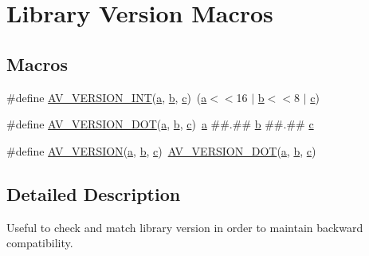 \hypertarget{group__version__utils}{}\section{Library Version Macros}
\label{group__version__utils}
\subsection*{Macros}
\begin{DoxyCompactItemize}
\item 
\#define \hyperlink{group__version__utils_gaaab323b60e1a6e38ec939efe881474c7}{A\+V\+\_\+\+V\+E\+R\+S\+I\+O\+N\+\_\+\+I\+NT}(\hyperlink{rfft2d_test_m_l_8m_a4124bc0a9335c27f086f24ba207a4912}{a},  \hyperlink{convtest_8m_a21ad0bd836b90d08f4cf640b4c298e7c}{b},  \hyperlink{rfft2d_test_m_l_8m_ae0323a9039add2978bf5b49550572c7c}{c})~(\hyperlink{rfft2d_test_m_l_8m_a4124bc0a9335c27f086f24ba207a4912}{a}$<$$<$16 $\vert$ \hyperlink{convtest_8m_a21ad0bd836b90d08f4cf640b4c298e7c}{b}$<$$<$8 $\vert$ \hyperlink{rfft2d_test_m_l_8m_ae0323a9039add2978bf5b49550572c7c}{c})
\item 
\#define \hyperlink{group__version__utils_gae4a414a06fd428d25f6f20007f9c38cd}{A\+V\+\_\+\+V\+E\+R\+S\+I\+O\+N\+\_\+\+D\+OT}(\hyperlink{rfft2d_test_m_l_8m_a4124bc0a9335c27f086f24ba207a4912}{a},  \hyperlink{convtest_8m_a21ad0bd836b90d08f4cf640b4c298e7c}{b},  \hyperlink{rfft2d_test_m_l_8m_ae0323a9039add2978bf5b49550572c7c}{c})~\hyperlink{rfft2d_test_m_l_8m_a4124bc0a9335c27f086f24ba207a4912}{a} \#\#.\#\# \hyperlink{convtest_8m_a21ad0bd836b90d08f4cf640b4c298e7c}{b} \#\#.\#\# \hyperlink{rfft2d_test_m_l_8m_ae0323a9039add2978bf5b49550572c7c}{c}
\item 
\#define \hyperlink{group__version__utils_ga544629c436701faf48e33d650ace1289}{A\+V\+\_\+\+V\+E\+R\+S\+I\+ON}(\hyperlink{rfft2d_test_m_l_8m_a4124bc0a9335c27f086f24ba207a4912}{a},  \hyperlink{convtest_8m_a21ad0bd836b90d08f4cf640b4c298e7c}{b},  \hyperlink{rfft2d_test_m_l_8m_ae0323a9039add2978bf5b49550572c7c}{c})~\hyperlink{group__version__utils_gae4a414a06fd428d25f6f20007f9c38cd}{A\+V\+\_\+\+V\+E\+R\+S\+I\+O\+N\+\_\+\+D\+OT}(\hyperlink{rfft2d_test_m_l_8m_a4124bc0a9335c27f086f24ba207a4912}{a}, \hyperlink{convtest_8m_a21ad0bd836b90d08f4cf640b4c298e7c}{b}, \hyperlink{rfft2d_test_m_l_8m_ae0323a9039add2978bf5b49550572c7c}{c})
\end{DoxyCompactItemize}


\subsection{Detailed Description}
Useful to check and match library version in order to maintain backward compatibility. 

